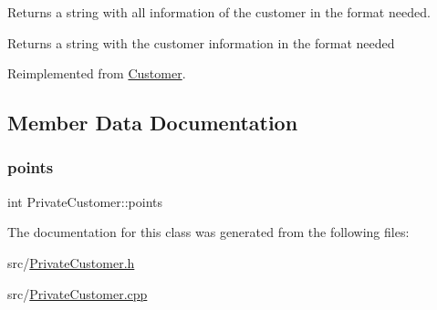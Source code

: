 Returns a string with all information of the customer in the format needed. \begin{DoxyReturn}{Returns}
a string with the customer information in the format needed 
\end{DoxyReturn}


Reimplemented from \hyperlink{classCustomer_aa609cffee22046082003ea0ac3c191af}{Customer}.



\subsection{Member Data Documentation}
\hypertarget{classPrivateCustomer_a1dd69e30a5c32c3cab647f96eaa89325}{}\label{classPrivateCustomer_a1dd69e30a5c32c3cab647f96eaa89325} 
\subsubsection{\texorpdfstring{points}{points}}
{\footnotesize\ttfamily int Private\+Customer\+::points\hspace{0.3cm}{\ttfamily [private]}}



The documentation for this class was generated from the following files\+:\begin{DoxyCompactItemize}
\item 
src/\hyperlink{PrivateCustomer_8h}{Private\+Customer.\+h}\item 
src/\hyperlink{PrivateCustomer_8cpp}{Private\+Customer.\+cpp}\end{DoxyCompactItemize}
